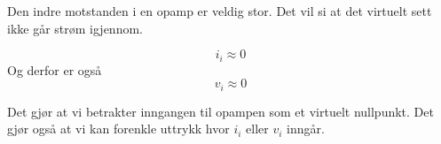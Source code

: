 Den indre motstanden i en opamp er veldig stor.
Det vil si at det virtuelt sett ikke går strøm igjennom.

$$i_i \approx 0$$
Og derfor er også
$$v_i \approx 0$$

Det gjør at vi betrakter inngangen til opampen som et virtuelt nullpunkt.
Det gjør også at vi kan forenkle uttrykk hvor $i_i$ eller $v_i$ inngår.
